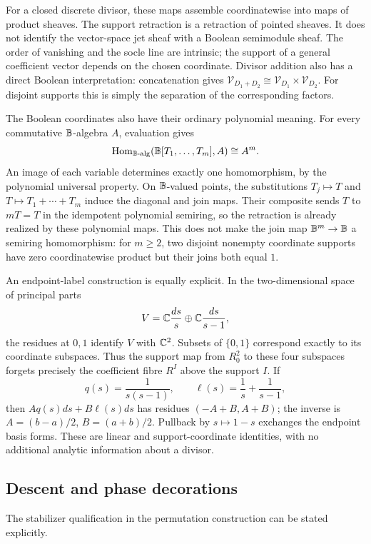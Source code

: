 For a closed discrete divisor, these maps assemble coordinatewise into maps of product sheaves. The support retraction is a retraction of pointed sheaves. It does not identify the vector-space jet sheaf with a Boolean semimodule sheaf. The order of vanishing and the socle line are intrinsic; the support of a general coefficient vector depends on the chosen coordinate. Divisor addition also has a direct Boolean interpretation: concatenation gives $\mathcal V_{D_1+D_2}\cong\mathcal V_{D_1}\times\mathcal V_{D_2}$. For disjoint supports this is simply the separation of the corresponding factors.

The Boolean coordinates also have their ordinary polynomial meaning. For every commutative $\mathbb B$-algebra $A$, evaluation gives
\[
 \operatorname{Hom}_{\mathbb B\text{-alg}}(\mathbb B[T_1,\ldots,T_m],A)
       \cong A^m.
\]
An image of each variable determines exactly one homomorphism, by the polynomial universal property. On $\mathbb B$-valued points, the substitutions $T_j\mapsto T$ and $T\mapsto T_1+\cdots+T_m$ induce the diagonal and join maps. Their composite sends $T$ to $mT=T$ in the idempotent polynomial semiring, so the retraction is already realized by these polynomial maps. This does not make the join map $\mathbb B^m\to\mathbb B$ a semiring homomorphism: for $m\geq2$, two disjoint nonempty coordinate supports have zero coordinatewise product but their joins both equal $1$.

An endpoint-label construction is equally explicit. In the two-dimensional space of principal parts
\[
 V=\mathbb C\frac{ds}{s}\oplus\mathbb C\frac{ds}{s-1},
\]
the residues at $0,1$ identify $V$ with $\mathbb C^2$. Subsets of $\{0,1\}$ correspond exactly to its coordinate subspaces. Thus the support map from $R_0^2$ to these four subspaces forgets precisely the coefficient fibre $R^I$ above the support $I$. If
\[
 q(s)=\frac1{s(s-1)},\qquad
 \ell(s)=\frac1s+\frac1{s-1},
\]
then $Aq(s)ds+B\ell(s)ds$ has residues $(-A+B,A+B)$; the inverse is $A=(b-a)/2$, $B=(a+b)/2$. Pullback by $s\mapsto1-s$ exchanges the endpoint basis forms. These are linear and support-coordinate identities, with no additional analytic information about a divisor.

\subsection{Descent and phase decorations}

The stabilizer qualification in the permutation construction can be stated explicitly.

